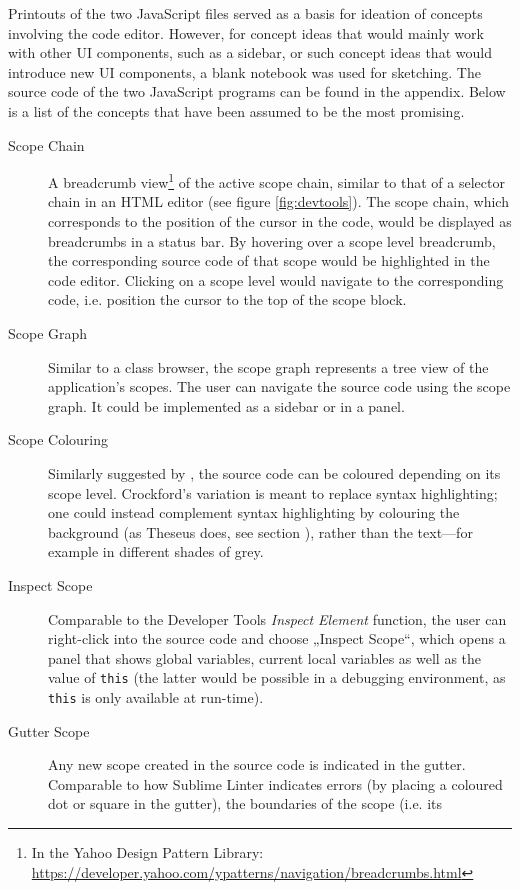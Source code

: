 Printouts of the two JavaScript files served as a basis for ideation of
concepts involving the code editor. However, for concept ideas that
would mainly work with other UI components, such as a sidebar, or such
concept ideas that would introduce new UI components, a blank notebook
was used for sketching. The source code of the two JavaScript programs
can be found in the appendix. Below is a list of the concepts that have
been assumed to be the most promising.

\begin{description}
\item[Scope Chain]
A breadcrumb
view\footnote{In the Yahoo Design Pattern Library: \url{https://developer.yahoo.com/ypatterns/navigation/breadcrumbs.html}}
of the active scope chain, similar to that of a selector chain in an
HTML editor (see figure \ref{fig:devtools}). The scope chain, which
corresponds to the position of the cursor in the code, would be
displayed as \gls{breadcrumbs} in a status bar. By hovering over a scope
level breadcrumb, the corresponding source code of that scope would be
highlighted in the code editor. Clicking on a scope level would navigate
to the corresponding code, i.e. position the cursor to the top of the
scope block.
\item[Scope Graph]
Similar to a class browser, the scope graph represents a tree view of
the application’s scopes. The user can navigate the source code using
the scope graph. It could be implemented as a sidebar or in a panel.
\item[Scope Colouring]
Similarly suggested by , the source code can be
coloured depending on its scope level. Crockford’s variation is meant to
replace syntax highlighting; one could instead complement syntax
highlighting by colouring the background (as Theseus does, see section
), rather than the text—for example in different shades
of grey.
\item[Inspect Scope]
Comparable to the Developer Tools \emph{Inspect Element} function, the
user can right-click into the source code and choose „Inspect Scope“,
which opens a panel that shows global variables, current local variables
as well as the value of \texttt{this} (the latter would be possible in a
debugging environment, as \texttt{this} is only available at run-time).
\item[Gutter Scope]
Any new scope created in the source code is indicated in the gutter.
Comparable to how Sublime Linter indicates errors (by placing a coloured
dot or square in the gutter), the boundaries of the scope (i.e. its

\end{description}
